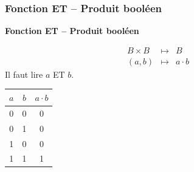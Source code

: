 \documentclass[11pt,oneside]{article}
\begin{document}
\subsubsection{Fonction ET -- Produit booléen}

\begin{defi}
\textbf{Fonction ET -- Produit booléen}

\begin{minipage}[c]{.45\linewidth}
\begin{eqnarray*}
B \times B &\longmapsto& B\\
(a,b) &\longmapsto& a \cdot b
\end{eqnarray*}
Il faut lire $a$ ET $b$. 
\end{minipage} \hfill
\begin{minipage}[c]{.45\linewidth}
\begin{center}
\begin{tabular}{|c|c||c|}
\hline
$a$ & $b$ & $a\cdot b$ \\
\hline
0 & 0 & 0 \\ \hline
0 & 1 & 0 \\ \hline
1 & 0 & 0 \\ \hline
1 & 1 & 1 \\ \hline
\end{tabular}
\end{center}
\end{minipage}
\end{defi}
\end{document}
